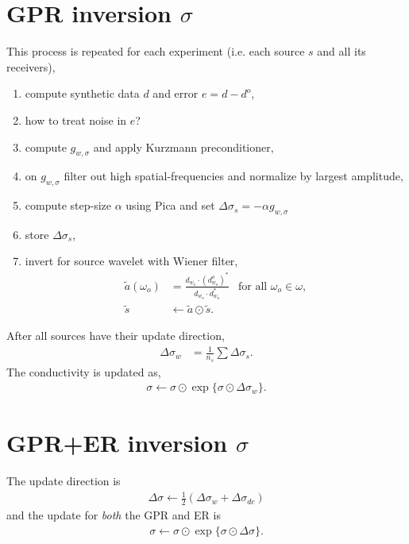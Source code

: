 \documentclass[a4paper,12pt]{article}
\begin{document}
\section*{GPR inversion $\sigma$}
This process is repeated for each experiment (i.e. each source $s$ and all its receivers),
\begin{enumerate}
\item compute synthetic data $d$ and error $e=d-d^o$,
\item \color{red} how to treat noise in $e$?\color{black}
\item compute $g_{w,\sigma}$ and apply Kurzmann preconditioner,
\item on $g_{w,\sigma}$ filter out high spatial-frequencies and normalize by largest amplitude,
\item compute step-size $\alpha$ using Pica and set $\Delta\sigma_s=-\alpha g_{w,\sigma}$
\item store $\Delta\sigma_s$,
\item invert for source wavelet with Wiener filter,
\begin{align*}
\tilde{a}(\omega_o) &= \frac{d_{w_o}\cdot (d_{w_o}^o)^*}{d_{w_o}\cdot d_{w_o}^*} &
\mbox{for all }\omega_o\in\omega,\\
\tilde{s} &\gets \tilde{a}\odot\tilde{s}.
\end{align*}
\end{enumerate}
After all sources have their update direction, 
\begin{align*}
\Delta\sigma_w &= \frac{1}{n_s} \sum\Delta\sigma_s.
\end{align*}
The conductivity is updated as,
\begin{align*}
\sigma\gets\sigma\odot\exp\{\sigma\odot\Delta\sigma_w\}.
\end{align*} 
% 
\section*{GPR+ER inversion $\sigma$}
The update direction is 
\begin{align*}
\Delta\sigma\gets \frac{1}{2} (\Delta\sigma_w + \Delta\sigma_{dc}) 
\end{align*} 
and the update for {\it both} the GPR and ER is
\begin{align*}
\sigma\gets\sigma\odot\exp\{\sigma\odot\Delta\sigma\}.
\end{align*} 
%
% 
% 
\end{document}

